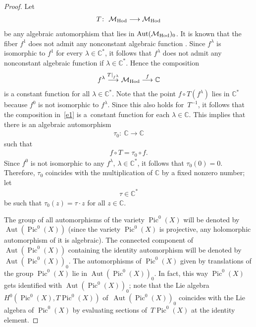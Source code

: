 \documentclass[pdftex]{sigma}
\numberwithin{equation}{section}
\begin{document}
\begin{proof} Let
\begin{gather*}
T \colon \ {\mathcal M}_{\rm Hod} \longrightarrow {\mathcal M}_{\rm Hod}
\end{gather*}
be any algebraic automorphism that lies in $\operatorname{Aut}({\mathcal M}_{\rm Hod})_0$. It is known that the f\/iber $f^1$ does not admit any nonconstant algebraic function \cite[Proposition~2.2]{BBS}. Since $f^\lambda$ is isomorphic to $f^1$ for every $\lambda \in {\mathbb C}^*$, it follows that $f^\lambda$ does not admit any nonconstant algebraic function if $\lambda \in {\mathbb C}^*$. Hence the composition
\begin{gather}\label{e1}
f^\lambda \stackrel{T\vert_{f^\lambda}}{\longrightarrow} {\mathcal M}_{\rm Hod} \stackrel{f}{\longrightarrow} \mathbb C
\end{gather}
is a constant function for all $\lambda \in {\mathbb C}^*$. Note that the point $f\circ T(f^{\lambda})$ lies in ${\mathbb C}^*$ because $f^0$ is not isomorphic to $f^\lambda$. Since this also holds for~$T^{-1}$, it follows that the composition in~\eqref{e1} is a~constant function for each $\lambda \in {\mathbb C}$. This implies that there is an algebraic automorphism
\begin{gather*}
\tau_0 \colon \ {\mathbb C} \longrightarrow \mathbb C
\end{gather*}
such that
\begin{gather*}
f\circ T = \tau_0 \circ f .
\end{gather*}
Since $f^0$ is not isomorphic to any $f^\lambda$, $\lambda \in {\mathbb C}^*$, it follows that $\tau_0(0) = 0$. Therefore, $\tau_0$ coincides with the multiplication of $\mathbb C$ by a f\/ixed nonzero number; let
\begin{gather}\label{e4}
\tau \in {\mathbb C}^*
\end{gather}
be such that $\tau_0(z) = \tau \cdot z$ for all $z \in \mathbb C$.

The group of all automorphisms of the variety $\operatorname{Pic}^0(X)$ will be denoted by $\operatorname{Aut}(\operatorname{Pic}^0(X))$ (since the variety $\operatorname{Pic}^0(X)$ is projective, any holomorphic automorphism of it is algebraic). The connected component of~$\operatorname{Aut}(\operatorname{Pic}^0(X))$ containing the identity automorphism will be denoted by~$\operatorname{Aut}(\operatorname{Pic}^0(X))_0$. The automorphisms of $\operatorname{Pic}^0(X)$ given by translations of the group $\operatorname{Pic}^0(X)$ lie in $\operatorname{Aut}(\operatorname{Pic}^0(X))_0$. In fact, this way $\operatorname{Pic}^0(X)$ gets identif\/ied with
$\operatorname{Aut}(\operatorname{Pic}^0(X))_0$; note that the Lie algebra $H^0(\operatorname{Pic}^0(X), T\operatorname{Pic}^0(X))$ of~$\operatorname{Aut}(\operatorname{Pic}^0(X))_0$ coincides with the Lie algebra of $\operatorname{Pic}^0(X)$ by evaluating sections of~$T\operatorname{Pic}^0(X)$ at the identity element.


\end{proof}
\end{document}
